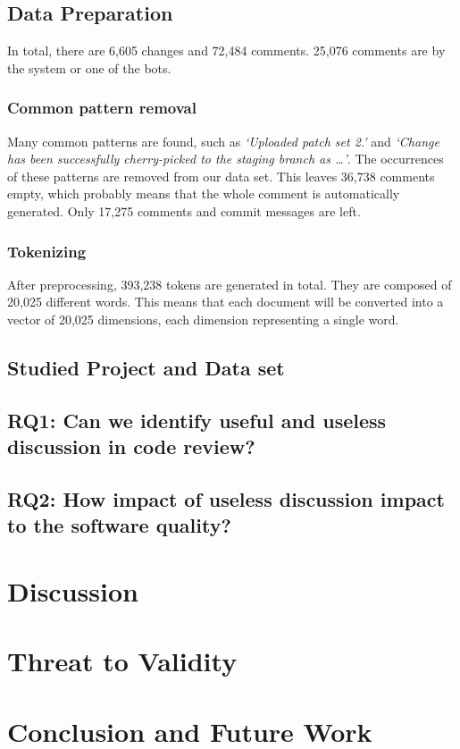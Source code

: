 \documentclass[conference]{IEEEtran}
\begin{document}
\subsection{Data Preparation}

In total, there are 6,605 changes and 72,484 comments. 25,076 comments are by the system or one of the bots.

\subsubsection{Common pattern removal}

Many common patterns are found, such as \emph{`Uploaded patch set 2.'} and \emph{`Change has been successfully cherry-picked to the staging branch as \dots'}.
The occurrences of these patterns are removed from our data set.
This leaves 36,738 comments empty, which probably means that the whole comment is automatically generated.
Only 17,275 comments and commit messages are left.

\subsubsection{Tokenizing}

After preprocessing, 393,238 tokens are generated in total. They are composed of 20,025 different words.
This means that each document will be converted into a vector of 20,025 dimensions, each dimension representing a single word.





\subsection{Studied Project and Data set}
\subsection{RQ1: Can we identify useful and useless discussion in code review?}
\subsection{RQ2: How impact of useless discussion impact to the software quality?}


\section{Discussion}



\section{Threat to Validity}


\section{Conclusion and Future Work}


\IEEEpeerreviewmaketitle



%



\end{document}
